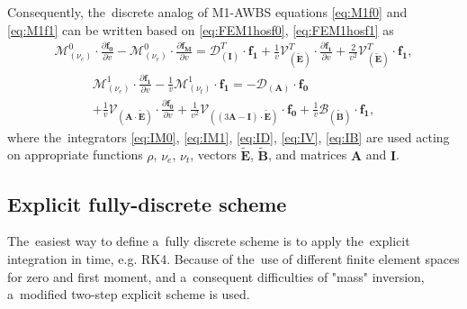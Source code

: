 \documentclass[preprint,12pt]{elsarticle}
\newcommand{\pdv}[2]{\frac{\partial{#1}}{\partial{#2}}}
\newcommand{\vect}[1]{\boldsymbol{#1}}
\newcommand{\matr}[1]{\mathbf{#1}}
\newcommand{\nue}{\nu_{e}}
\newcommand{\nutot}{\nu_{t}}
\newcommand{\vmag}{v}
\newcommand{\tE}{\vect{\tilde{E}}}
\newcommand{\tB}{\vect{\tilde{B}}}
\newcommand{\fM}{f_M}
\newcommand{\vfzero}{\vect{f_0}}
\newcommand{\fone}{\vect{f_1}}
\newcommand{\MI}{\matr{I}}
\newcommand{\MA}{\matr{A}}
\newcommand{\IM}{\boldsymbol{\mathcal{M}}}
\newcommand{\ID}{\boldsymbol{\mathcal{D}}}
\newcommand{\IV}{\boldsymbol{\mathcal{V}}}
\newcommand{\IB}{\boldsymbol{\mathcal{B}}}
\begin{document}
Consequently, the~discrete analog of M1-AWBS equations
\eqref{eq:M1f0} and \eqref{eq:M1f1} can be written based on 
 \eqref{eq:FEM1hosf0}, \eqref{eq:FEM1hosf1} as
\begin{multline}
  \IM^0_{(\nue)} \cdot \pdv{\vfzero}{\vmag} 
  - \IM^0_{(\nue)} \cdot \pdv{\vect{\fM}}{\vmag}
  = 
  \ID^T_{\left(\MI\right)} \cdot \fone
  + \frac{1}{\vmag}\IV^T_{\left(\tE\right)} \cdot 
  \pdv{\fone}{\vmag} 
  + \frac{2}{\vmag^2}\IV^T_{\left(\tE\right)} \cdot \fone ,  
  \label{eq:semiM1hosf0}
\end{multline}
\begin{multline}
  \IM^1_{(\nue)} \cdot \pdv{\fone}{\vmag} 
  - \frac{1}{\vmag}\IM^1_{\left( \nutot \right)} 
  \cdot \fone 
  = 
  - \ID_{\left(\MA\right)}\cdot \vfzero \\ 
  + \frac{1}{\vmag}\IV_{\left(\MA \cdot \tE\right)} \cdot
  \pdv{\vfzero}{\vmag}
  + \frac{1}{\vmag^2}\IV_{\left(\left( 3\MA - \MI \right) \cdot \tE \right)} 
  \cdot \vfzero
  + \frac{1}{\vmag}\IB_{\left( \tB \right)} \cdot \fone ,
  \label{eq:semiM1hosf1}
\end{multline}
where the~integrators \eqref{eq:IM0}, \eqref{eq:IM1},
\eqref{eq:ID}, \eqref{eq:IV}, \eqref{eq:IB} are used acting on appropriate
functions $\rho$, $\nue$, $\nutot$, vectors $\tE$, $\tB$, and matrices $\MA$
and $\MI$.



\subsection{Explicit fully-discrete scheme}\label{sec:expl_fullydiscrete_scheme}
The~easiest way to define a~fully discrete scheme is to apply the~explicit
integration in time, e.g. RK4.
Because of the~use of different finite element spaces for zero and first moment,
and a~consequent difficulties of "mass" inversion, a~modified two-step explicit
scheme is used.
\end{document}
